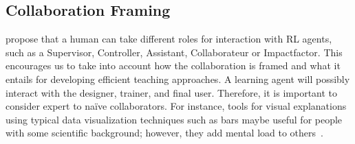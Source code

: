 \documentclass[twoside,11pt]{article}
\begin{document}


\subsection{Collaboration Framing}

\citet{WuEtAl:2021:HITLMLSurvey} propose that a human can take different roles for interaction with RL agents, such as a Supervisor, Controller, Assistant, Collaborateur or Impactfactor. This encourages us to take into account how the collaboration is framed and what it entails for developing efficient teaching approaches. A learning agent will possibly interact with the designer, trainer, and final user. Therefore, it is important to consider expert to na\"ive collaborators. For instance, tools for visual explanations using typical data visualization techniques such as bars maybe useful for people with some scientific background; however, they add mental load to others~\citep{anderson:20}. 
 
\end{document}
